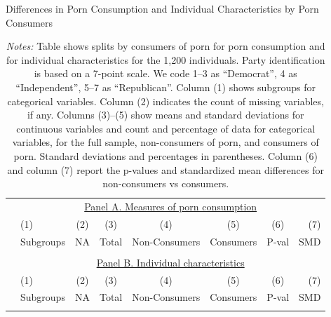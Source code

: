 \documentclass[12pt, letterpaper]{article}
\begin{document}
\begin{table}[ht] \centering \small \setlength\tabcolsep{5 pt}
	\caption{Differences in Porn Consumption and Individual Characteristics by Porn Consumers}
	\label{tab:characteristics_split_by_porn_consumers}
	\begin{adjustbox}{max width=\textwidth}
		\begin{tabular}{@{\hspace{0\tabcolsep}}llrcccrr@{\hspace{0\tabcolsep}}}
			\toprule
			&\multicolumn{7}{c}{\underline{Panel A. Measures of porn consumption}}\\
			&\multicolumn{1}{l}{(1)}&\multicolumn{1}{c}{(2)}&\multicolumn{1}{c}{(3)}&\multicolumn{1}{c}{(4)}&\multicolumn{1}{c}{(5)}&\multicolumn{1}{c}{(6)}&\multicolumn{1}{r}{(7)}\\			
			&\multicolumn{1}{l}{Subgroups}&\multicolumn{1}{c}{NA}&\multicolumn{1}{c}{Total}&\multicolumn{1}{c}{Non-Consumers}&\multicolumn{1}{c}{Consumers}&\multicolumn{1}{c}{P-val}&\multicolumn{1}{r}{SMD}\\
			\cmidrule{2-8}
			\\
			\cmidrule{2-8}
			&\multicolumn{7}{c}{\underline{Panel B. Individual characteristics}}\\
			&\multicolumn{1}{l}{(1)}&\multicolumn{1}{c}{(2)}&\multicolumn{1}{c}{(3)}&\multicolumn{1}{c}{(4)}&\multicolumn{1}{c}{(5)}&\multicolumn{1}{c}{(6)}&\multicolumn{1}{r}{(7)}\\			
			&\multicolumn{1}{l}{Subgroups}&\multicolumn{1}{c}{NA}&\multicolumn{1}{c}{Total}&\multicolumn{1}{c}{Non-Consumers}&\multicolumn{1}{c}{Consumers}&\multicolumn{1}{c}{P-val}&\multicolumn{1}{r}{SMD}\\
			\cmidrule{2-8}
			\\
			\bottomrule
		\end{tabular}
	\end{adjustbox}
	\caption*{\scriptsize \emph{Notes:}
		Table shows splits by consumers of porn for porn consumption and for individual characteristics for the 1,200 individuals.
		Party identification is based on a 7-point scale. We code 1--3 as ``Democrat'', 4 as ``Independent'', 5--7 as ``Republican''.
		Column (1) shows subgroups for categorical variables.
		Column (2) indicates the count of missing variables, if any.
		Columns (3)--(5) show means and standard deviations for continuous variables and count and percentage of data for categorical variables, for the full sample, non-consumers of porn, and consumers of porn.
		Standard deviations and percentages in parentheses.
		Column (6) and column (7) report the p-values and standardized mean differences for non-consumers vs consumers.
	}
\end{table}
\end{document}
